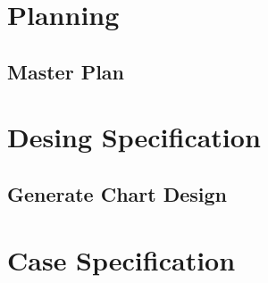 \documentclass[a4paper, 12pt]{report}
\begin{document}
\tableofcontents

\part{Planning}

\chapter{Master Plan}


\part{Desing Specification}
\label{part:DesignSpecification}
\chapter{Generate Chart Design}


\part{Case Specification}
\label{part:CaseSpecification}

\end{document}
